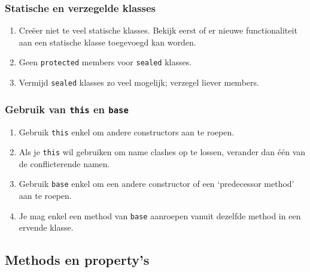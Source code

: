 \documentclass[a4paper,11pt]{article}
\begin{document}
\subsubsection{Statische en verzegelde klasses}
\begin{enumerate}[resume]
\item Cre\"eer niet te veel statische klasses.  Bekijk eerst of er nieuwe
functionaliteit aan een statische klasse toegevoegd kan worden.
\item Geen \lstinline !protected! members voor \lstinline !sealed! klasses.
\item Vermijd \lstinline !sealed! klasses zo veel mogelijk; verzegel liever
members.
\end{enumerate}


\subsubsection{Gebruik van \lstinline !this! en \lstinline !base!}
\begin{enumerate}[resume]
\item Gebruik \lstinline !this! enkel om andere constructors aan te roepen.
\item Als je \lstinline !this! wil gebruiken om name clashes op te lossen,
verander dan \'e\'en van de conflicterende namen.
\item Gebruik \lstinline !base! enkel om een andere constructor of een
`predecessor method' aan te roepen.
\item Je mag enkel een method van \lstinline !base! aanroepen vanuit
dezelfde method in een ervende klasse.
\end{enumerate}


\subsection{Methods en property's}
\end{document}
